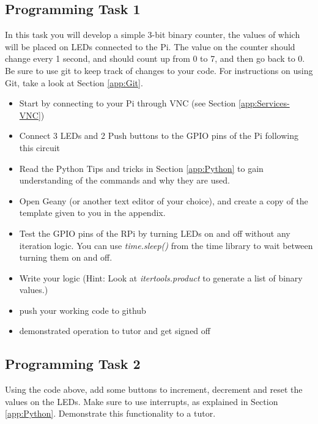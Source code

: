 \subsection{Programming Task 1}
In this task you will develop a simple 3-bit binary counter, the values of which will be placed on LEDs connected to the Pi. The value on the counter should change every 1 second, and should count up from 0 to 7, and then go back to 0.
Be sure to use git to keep track of changes to your code. For instructions on using Git, take a look at Section \ref{app:Git}.
\begin{itemize}
    \item Start by connecting to your Pi through VNC (see Section \ref{app:Services-VNC})
    \item Connect 3 LEDs and 2 Push buttons to the GPIO pins of the Pi following this circuit
    \item Read the Python Tips and tricks in Section \ref{app:Python} to gain understanding of the commands and why they are used.
    \item Open Geany (or another text editor of your choice), and create a copy of the template given to you in the appendix.
    \item Test the GPIO pins of the RPi by turning LEDs on and off without any iteration logic. You can use \textit{time.sleep()} from the time library to wait between turning them on and off.
    \item Write your logic (Hint: Look at \textit{itertools.product} to generate a list of binary values.)
    \item push your working code to github
    \item demonstrated operation to tutor and get signed off
\end{itemize}

\subsection{Programming Task 2}
Using the code above, add some buttons to increment, decrement and reset the values on the LEDs. Make sure to use interrupts, as explained in Section \ref{app:Python}. Demonstrate this functionality to a tutor.

